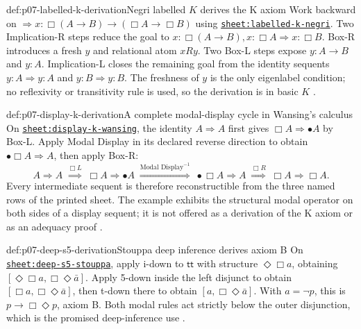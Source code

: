 \begin{hbexample}{def:p07-labelled-k-derivation}{Negri labelled \(K\) derives the K axiom}
Work backward on
\(\Rightarrow x:\Box(A\to B)\to(\Box A\to\Box B)\) using
\hyperref[sheet:labelled-k-negri]{\texttt{sheet:labelled-k-negri}}. Two
Implication-R steps reduce the goal to
\(x:\Box(A\to B),x:\Box A\Rightarrow x:\Box B\). Box-R introduces a fresh
\(y\) and relational atom \(xRy\). Two Box-L steps expose
\(y:A\to B\) and \(y:A\). Implication-L closes the remaining goal from the
identity sequents \(y:A\Rightarrow y:A\) and
\(y:B\Rightarrow y:B\). The freshness of \(y\) is the only eigenlabel
condition; no reflexivity or transitivity rule is used, so the derivation is in
basic \(K\) \cite{Negri2005}.
\end{hbexample}

\begin{hbexample}{def:p07-display-k-derivation}{A complete modal-display cycle in Wansing's calculus}
On \hyperref[sheet:display-k-wansing]{\texttt{sheet:display-k-wansing}}, the
identity \(A\Rightarrow A\) first gives
\(\Box A\Rightarrow\bullet A\) by Box-L.  Apply Modal Display in its declared
reverse direction to obtain
\(\bullet\Box A\Rightarrow A\), then apply Box-R:
\[
 A\Rightarrow A
 \;\overset{\Box L}{\Longrightarrow}\;
 \Box A\Rightarrow\bullet A
 \;\overset{\text{Modal Display}^{-1}}{\Longrightarrow}\;
 \bullet\Box A\Rightarrow A
 \;\overset{\Box R}{\Longrightarrow}\;
 \Box A\Rightarrow\Box A.
\]
Every intermediate sequent is therefore reconstructible from the three named
rows of the printed sheet.  The example exhibits the structural modal operator
on both sides of a display sequent; it is not offered as a derivation of the K
axiom or as an adequacy proof \cite{Wansing1994}.
\end{hbexample}

\begin{hbexample}{def:p07-deep-s5-derivation}{Stouppa deep inference derives axiom B}
On \hyperref[sheet:deep-s5-stouppa]{\texttt{sheet:deep-s5-stouppa}}, apply
i-down to \(\mathsf{tt}\) with structure \(\Diamond\Box a\), obtaining
\([\Diamond\Box a,\Box\Diamond\bar a]\). Apply 5-down inside the left
disjunct to obtain \([\Box a,\Box\Diamond\bar a]\), then t-down there to obtain
\([a,\Box\Diamond\bar a]\). With \(a=\neg p\), this is
\(p\to\Box\Diamond p\), axiom B. Both modal rules act strictly below the outer
disjunction, which is the promised deep-inference use \cite{Stouppa2007}.
\end{hbexample}

